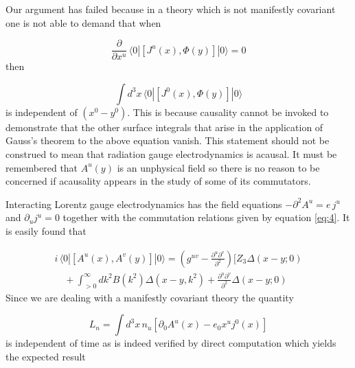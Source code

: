 \documentclass[%
  12pt,
  paper=letter,
  abstracton,
  pagesize=auto,
  version=last,
  DIV=calc
  ]{scrartcl}
\begin{document}
Our argument has failed because in a theory which is not manifestly
covariant one is not able to demand that when

\begin{equation*}
\frac{\partial}{\partial x^u}\, \langle 0|[J^u (x), \Phi (y)]|0\rangle = 0
\end{equation*}
then

\begin{equation*}
\int d^3x\, \langle 0|[J^0 (x), \Phi(y)]|0\rangle
\end{equation*}
is independent of $(x^0 - y^0)$.  This is because causality
cannot be invoked to demonstrate that the other surface integrals that
arise in the application of Gauss's theorem to the above equation
vanish.  This statement should not be construed to mean that radiation
gauge electrodynamics is acausal.  It must be remembered that $A^u
(y)$ is an unphysical field so there is no reason to be concerned if
acausality appears in the study of some of its commutators.

Interacting Lorentz gauge electrodynamics has the field
equations $-\partial^2A^u = e\, j^u$ and $\partial_uj^u=0$ together with the
commutation relations given by equation \eqref{eq:4}.  It is easily found that

\begin{multline}
\label{eq:5}
i\, \langle 0|[A^u(x), A^v(y)]|0\rangle =(g^{uv}-\frac{\partial^u \partial^v}{\partial^2})[Z_3\Delta(x-y;0) \\
\quad +\int^\infty_{>0} d k^2 B(k^2) \Delta(x-y, k^2)+\frac{\partial^u \partial^v}{\partial^2} \Delta(x-y;0)
\end{multline}
Since we are dealing with a manifestly covariant theory the quantity

\[L_n=\int d^3x\, n_u[\partial_0A^u(x)-e_0x^u j^{0}(x)]\]
is independent of time as is indeed verified by direct computation which
yields the expected result
\end{document}
